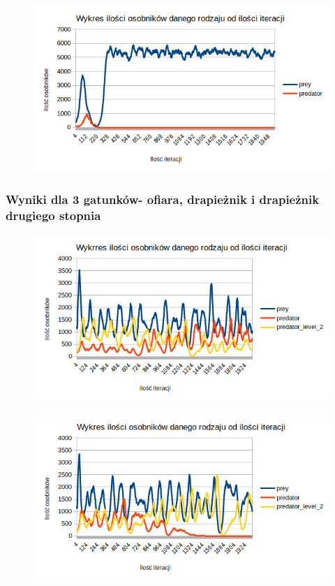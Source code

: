 \begin{figure}[H]
	\centering
	\includegraphics[width=1.1\linewidth]{img/samprey1}
	\caption{\label{fig:screen} }
\end{figure}

\subsubsection{Wyniki dla 3 gatunków- ofiara, drapieżnik i drapieżnik drugiego stopnia}


\begin{figure}[H]
	\centering
	\includegraphics[width=1.1\linewidth]{img/ok3}
	\caption{\label{fig:screen} }
\end{figure}
\begin{figure}[H]
	\centering
	\includegraphics[width=1.1\linewidth]{img/ok4}
	\caption{\label{fig:screen} }
\end{figure}

